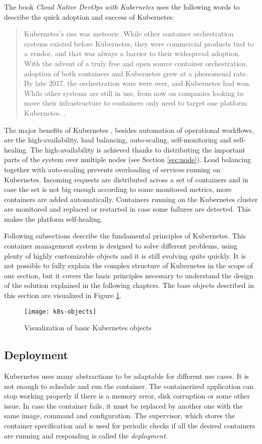 \documentclass[
  digital, %
  twoside, %
  table,   %
  nolof,   %
  nolot,   %
]{fithesis3}
\begin{document}
The book \textit{Cloud Native DevOps with Kubernetes} uses the following words to describe the quick adoption and success of Kubernetes:
\begin{quote}
Kubernetes’s rise was meteoric. While other container orchestration systems existed
before Kubernetes, they were commercial products tied to a vendor, and that was
always a barrier to their widespread adoption. With the advent of a truly free and
open source container orchestration, adoption of both containers and Kubernetes grew
at a phenomenal rate.
By late 2017, the orchestration wars were over, and Kubernetes had won. While other
systems are still in use, from now on companies looking to move their infrastructure
to containers only need to target one platform: Kubernetes. \cite[p. 11]{k8s}.
\end{quote}

The major benefits of Kubernetes \cite{k8s_features}, besides automation of operational workflows, are the high-availability, load balancing, auto-scaling, self-monitoring and self-healing. The high-availability is achieved thanks to distributing the important parts of the system over multiple nodes (see Section \ref{sec:node}). Load balancing together with auto-scaling prevents overloading of services running on Kubernetes. Incoming requests are distributed across a set of containers and in case the set is not big enough according to some monitored metrics, more containers are added automatically. Containers running on the Kubernetes cluster are monitored and replaced or restarted in case some failures are detected. This makes the platform self-healing.

Following subsections describe the fundamental principles of Kubernetes. This container management system is designed to solve different problems, using plenty of highly customizable objects and it is still evolving quite quickly. It is not possible to fully explain the complex structure of Kubernetes in the scope of one section, but it covers the basic principles necessary to understand the design of the solution explained in the following chapters. The base objects described in this section are visualized in Figure \ref{fig:k8s_objects}.


\begin{figure}[H]
\caption{Visualization of basic Kubernetes objects}
\centering
\texttt{[image: k8s-objects]}
\label{fig:k8s_objects}
\end{figure}

\subsection{Deployment} \label{sec:deployment}
Kubernetes uses many abstractions to be adaptable for different use cases. It is not enough to schedule and run the container. The containerized application can stop working properly if there is a memory error, disk corruption or some other issue. In case the container fails, it must be replaced by another one with the same image, command and configuration. The supervisor, which stores the container specification and is used for periodic checks if all the desired containers are running and responding is called the \textit{deployment}.
\end{document}
